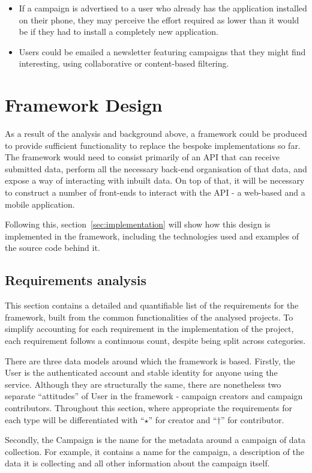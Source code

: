 \documentclass{article}
\newcommand\ssection{\clearpage\section}
\begin{document}
\begin{enumerate}
\begin{itemize}
				\item If a campaign is advertised to a user who already has the application installed on their phone, they may perceive the effort required as lower than it would be if they had to install a completely new application.
				\item Users could be emailed a newsletter featuring campaigns that they might find interesting, using collaborative or content-based filtering.
			\end{itemize}
		\end{enumerate}

	\ssection{Framework Design}
	\label{sec:architecture}
		As a result of the analysis and background above, a framework could be produced to provide sufficient functionality to replace the bespoke implementations so far. The framework would need to consist primarily of an API that can receive submitted data, perform all the necessary back-end organisation of that data, and expose a way of interacting with inbuilt data. On top of that, it will be necessary to construct a number of front-ends to interact with the API - a web-based and a mobile application.

		Following this, section~\ref{sec:implementation} will show how this design is implemented in the framework, including the technologies used and examples of the source code behind it.

		\subsection{Requirements analysis}

		This section contains a detailed and quantifiable list of the requirements for the framework, built from the common functionalities of the analysed projects. To simplify accounting for each requirement in the implementation of the project, each requirement follows a continuous count, despite being split across categories.

		There are three data models around which the framework is based. Firstly, the User is the authenticated account and stable identity for anyone using the service. Although they are structurally the same, there are nonetheless two separate ``attitudes'' of User in the framework - campaign creators and campaign contributors. Throughout this section, where appropriate the requirements for each type will be differentiated with ``$\star$'' for creator and ``$\dagger$'' for contributor.

		Secondly, the Campaign is the name for the metadata around a campaign of data collection. For example, it contains a name for the campaign, a description of the data it is collecting and all other information about the campaign itself.
\end{document}
